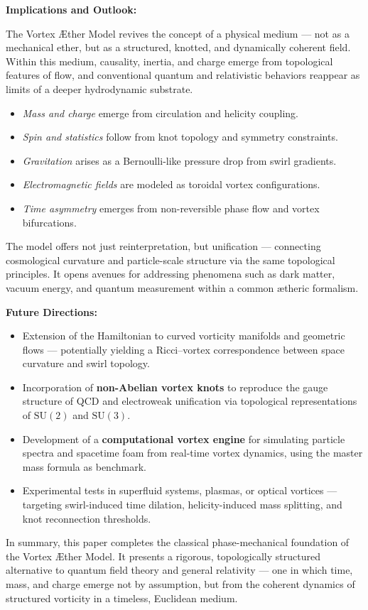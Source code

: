 \vspace{0.5em}
\noindent
\textbf{Implications and Outlook:}

The Vortex \AE{}ther Model revives the concept of a physical medium — not as a mechanical ether, but as a structured, knotted, and dynamically coherent field. Within this medium, causality, inertia, and charge emerge from topological features of flow, and conventional quantum and relativistic behaviors reappear as limits of a deeper hydrodynamic substrate.

\begin{itemize}
    \item \emph{Mass and charge} emerge from circulation and helicity coupling.
    \item \emph{Spin and statistics} follow from knot topology and symmetry constraints.
    \item \emph{Gravitation} arises as a Bernoulli-like pressure drop from swirl gradients.
    \item \emph{Electromagnetic fields} are modeled as toroidal vortex configurations.
    \item \emph{Time asymmetry} emerges from non-reversible phase flow and vortex bifurcations.
\end{itemize}

The model offers not just reinterpretation, but unification — connecting cosmological curvature and particle-scale structure via the same topological principles. It opens avenues for addressing phenomena such as dark matter, vacuum energy, and quantum measurement within a common ætheric formalism.

\vspace{0.5em}
\noindent
\textbf{Future Directions:}
\begin{itemize}
    \item Extension of the Hamiltonian to curved vorticity manifolds and geometric flows — potentially yielding a Ricci–vortex correspondence between space curvature and swirl topology.

    \item Incorporation of \textbf{non-Abelian vortex knots} to reproduce the gauge structure of QCD and electroweak unification via topological representations of $\mathrm{SU}(2)$ and $\mathrm{SU}(3)$.

    \item Development of a \textbf{computational vortex engine} for simulating particle spectra and spacetime foam from real-time vortex dynamics, using the master mass formula as benchmark.

    \item Experimental tests in superfluid systems, plasmas, or optical vortices — targeting swirl-induced time dilation, helicity-induced mass splitting, and knot reconnection thresholds.
\end{itemize}

\vspace{1em}
In summary, this paper completes the classical phase-mechanical foundation of the Vortex \AE{}ther Model. It presents a rigorous, topologically structured alternative to quantum field theory and general relativity — one in which time, mass, and charge emerge not by assumption, but from the coherent dynamics of structured vorticity in a timeless, Euclidean medium.
